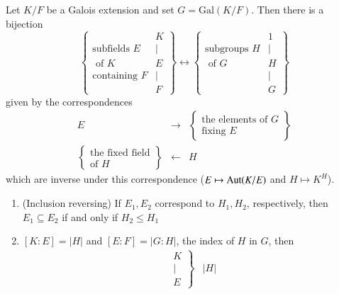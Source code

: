 \documentclass[12pt, a4paper, oneside, openright, titlepage]{book}
\begin{document}
\begin{namthm} \label{namthm:FundGal}
    Let $K/F$ be a Galois extension and set $G = \text{Gal}(K/F)$. Then there is a bijection \begin{equation*}
        \left\{\begin{array}{cc} & K \\ \text{subfields } E & \vert \\ \text{ of } K& E \\ \text{containing } F & \vert \\ & F\end{array}\right\} \leftrightarrow \left\{\begin{array}{cc} & 1 \\ \text{subgroups } H &  \vert \\ \text{ of } G& H \\  & \vert \\ & G\end{array}\right\}
    \end{equation*}
    given by the correspondences \begin{equation*}
        \begin{array}{ccc} E & \rightarrow & \left\{\begin{array}{cc} \text{the elements of } G \\ \text{fixing } E\end{array}\right\} \\ \left\{\begin{array}{cc} \text{the fixed field} \\ \text{of } H\end{array}\right\} & \leftarrow & H \end{array}
    \end{equation*}
    which are inverse under this correspondence ($E\mapsto \operatorname{Aut}(K/E)$ and $H\mapsto K^H$).\begin{enumerate}
        \item (Inclusion reversing) If $E_1,E_2$ correspond to $H_1,H_2$, respectively, then $E_1 \subseteq E_2$ if and only if $H_2 \leq H_1$
        \item $[K:E] = |H|$ and $[E:F] = |G:H|$, the index of $H$ in $G$, then \begin{equation*}
                \begin{array}{cc}
                    \left.\begin{array}{c} K \\ \vert \\ E \end{array}\right\} & |H| \\ 

\end{array}
\end{equation*}
\end{enumerate}
\end{namthm}
\end{document}

